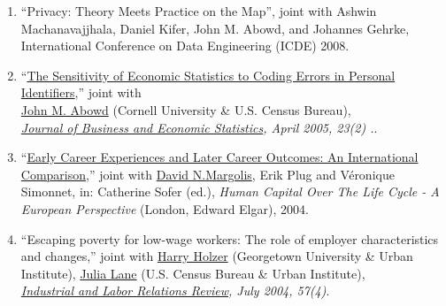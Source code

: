 \documentclass[10pt,letterpaper]{report}
\begin{document}
\begin{enumerate}
\item ``Privacy: Theory Meets Practice on the Map'', joint with Ashwin
  Machanavajjhala, Daniel Kifer, John M. Abowd, and Johannes Gehrke, International Conference on Data Engineering (ICDE) 2008.
\item ``\href{http://hermia.asa.catchword.org/vl=289536/cl=107/nw=1/rpsv/cw/asa/07350015/v23n2/s1/p133}{The Sensitivity of Economic Statistics to Coding Errors in Personal
  Identifiers},'' joint with \\
  \href{mailto:john_abowd@cornell.edu}{John M. Abowd} (Cornell University
  \& U.S. Census Bureau), \\
 {\it \href{http://www.amstat.org/publications/jbes/}{Journal of Business
     and Economic Statistics}, April 2005, 23(2) .}.%
\item ``\href{http://www.e-elgar.co.uk/action.lasso?-database=ElgarTitles.fp5&-layout=Website&-response=hitlist.html&-noresultserror=hitlist.html&CDM+Valid=Yes&-op=cn&-token.stype=Author%20names%20listing&bformat=&Author%20names%20listing=sofer&-maxrecords=10&-sortfield=Lead%20Title&-sortorder=ascending&-search}{Early Career Experiences and Later Career Outcomes: An
  International}
  \href{http://www.e-elgar.co.uk/action.lasso?-database=ElgarTitles.fp5&-layout=Website&-response=hitlist.html&-noresultserror=hitlist.html&CDM+Valid=Yes&-op=cn&-token.stype=Author%20names%20listing&bformat=&Author%20names%20listing=sofer&-maxrecords=10&-sortfield=Lead%20Title&-sortorder=ascending&-search}{ Comparison},'' joint with
\href{mailto:margolis@univ-paris1.fr}{David N.Margolis}, Erik Plug and
V\'eronique Simonnet, in: Catherine Sofer (ed.), {\it Human Capital Over The
  Life Cycle -  A European Perspective} (London, Edward Elgar), 2004.%
\item ``Escaping poverty for low-wage workers: The role of employer characteristics and changes,'' joint with
\href{hholzer@ui.urban.org}{Harry Holzer} (Georgetown University \& Urban Institute), \href{mailto:jlane@ui.urban.org}{Julia Lane} (U.S. Census
Bureau \& Urban Institute),\\
 {\it \href{http://www.ilr.cornell.edu/ilrreview/}{Industrial and Labor
     Relations Review}, July 2004, 57(4)}.%

\end{enumerate}
\end{document}

